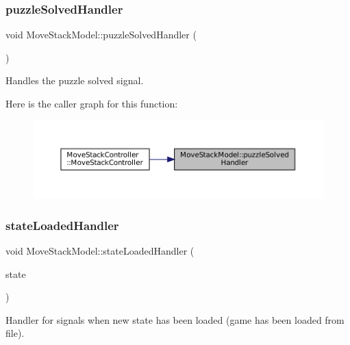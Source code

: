 \subsubsection{\texorpdfstring{puzzleSolvedHandler}{puzzleSolvedHandler}}
{\footnotesize\ttfamily void Move\+Stack\+Model\+::puzzle\+Solved\+Handler (\begin{DoxyParamCaption}{ }\end{DoxyParamCaption})\hspace{0.3cm}{\ttfamily [slot]}}



Handles the puzzle solved signal. 

Here is the caller graph for this function\+:
\nopagebreak
\begin{figure}[H]
\begin{center}
\leavevmode
\includegraphics[width=350pt]{class_move_stack_model_a7fba5a7c9c8cca32112274c87b45fa82_icgraph}
\end{center}
\end{figure}
\mbox{\label{class_move_stack_model_a2c8028466c62b5f8b269b71939c56ef8}} 
\subsubsection{\texorpdfstring{stateLoadedHandler}{stateLoadedHandler}}
{\footnotesize\ttfamily void Move\+Stack\+Model\+::state\+Loaded\+Handler (\begin{DoxyParamCaption}\item[{const \mbox{\hyperlink{struct_load_state}{Load\+State}} \&}]{state }\end{DoxyParamCaption})\hspace{0.3cm}{\ttfamily [slot]}}



Handler for signals when new state has been loaded (game has been loaded from file). 


